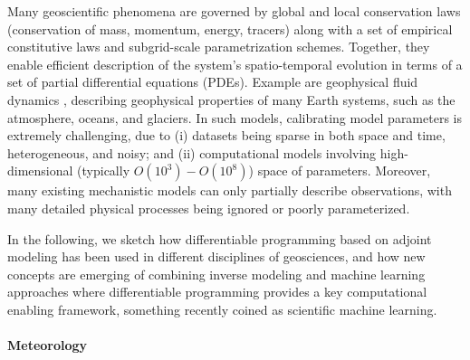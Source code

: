 Many geoscientific phenomena are governed by global and local conservation laws (conservation of mass, momentum, energy, tracers) along with a set of empirical constitutive laws and subgrid-scale parametrization schemes. 
Together, they enable efficient description of the system's spatio-temporal evolution in terms of a set of partial differential equations (PDEs).
Example are geophysical fluid dynamics \cite{Vallis:2016kv}, describing geophysical properties of many Earth systems, such as the atmosphere, oceans, and glaciers.
In such models, calibrating model parameters is extremely challenging, due to (i) datasets being sparse in both space and time, heterogeneous, and noisy; and (ii) computational models involving high-dimensional (typically $O(10^3) - O(10^8)$) space of parameters.
Moreover, many existing mechanistic models can only partially describe observations, with many detailed physical processes being ignored or poorly parameterized. 

In the following, we sketch how differentiable programming based on  adjoint modeling has been used in different disciplines of geosciences, and how new concepts are emerging of combining inverse modeling and machine learning approaches where differentiable programming provides a key computational enabling framework, something recently coined as scientific machine learning. 

\paragraph{Meteorology}

